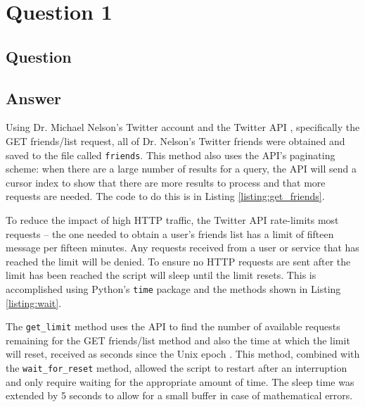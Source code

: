 \section{Question 1}

\subsection{Question}


\subsection{Answer}
Using Dr. Michael Nelson's Twitter account and the Twitter API \cite{api:twitter}, specifically the GET friends/list \cite{api:twitter_friendslist} request, all of Dr. Nelson's Twitter friends were obtained and saved to the file called {\tt friends}. This method also uses the API's paginating scheme: when there are a large number of results for a query, the API will send a cursor index to show that there are more results to process and that more requests are needed. The code to do this is in Listing \ref{listing:get_friends}. 



\clearpage

To reduce the impact of high HTTP traffic, the Twitter API rate-limits most requests -- the one needed to obtain a user's friends list has a limit of fifteen message per fifteen minutes. Any requests received from a user or service that has reached the limit will be denied. To ensure no HTTP requests are sent after the limit has been reached the script will sleep until the limit resets. This is accomplished using Python's {\tt time} package \cite{py:time} and the methods shown in Listing \ref{listing:wait}.



The {\tt get\_limit} method uses the API to find the number of available requests remaining for the GET friends/list method and also the time at which the limit will reset, received as seconds since the Unix epoch \cite{misc:stack_unixepoch}. This method, combined with the {\tt wait\_for\_reset} method, allowed the script to restart after an interruption and only require waiting for the appropriate amount of time. The sleep time was extended by 5 seconds to allow for a small buffer in case of mathematical errors.\\

